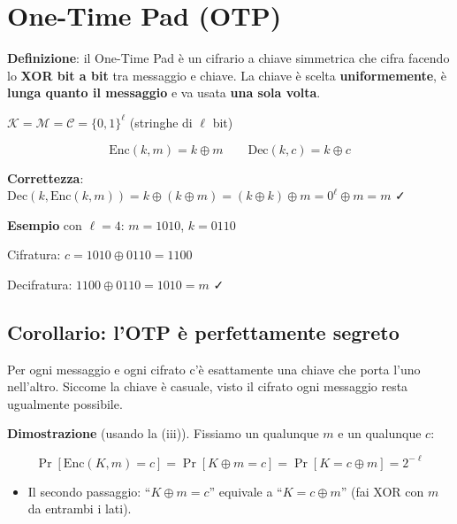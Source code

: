 \section{One-Time Pad (OTP)}

\textbf{Definizione}: il One-Time Pad è un cifrario a chiave simmetrica che cifra facendo lo \textbf{XOR bit a bit} tra messaggio e chiave. La chiave è scelta \textbf{uniformemente}, è \textbf{lunga quanto il messaggio} e va usata \textbf{una sola volta}.

\(\mathcal{K} = \mathcal{M} = \mathcal{C} = \{0,1\}^\ell\) (stringhe di \(\ell\) bit)

\[
\text{Enc}(k, m) = k \oplus m \qquad \text{Dec}(k, c) = k \oplus c
\]

\textbf{Correttezza}: \(\text{Dec}(k, \text{Enc}(k, m)) = k \oplus (k \oplus m) = (k \oplus k) \oplus m = 0^\ell \oplus m = m\) ✓

\begin{esempio}

\textbf{Esempio} con \(\ell = 4\): \(m = 1010\), \(k = 0110\)

Cifratura: \(c = 1010 \oplus 0110 = 1100\)

Decifratura: \(1100 \oplus 0110 = 1010 = m\) ✓

\end{esempio}

\subsection{Corollario: l'OTP è perfettamente segreto}

\begin{inbreve}

Per ogni messaggio e ogni cifrato c'è esattamente una chiave che porta l'uno nell'altro. Siccome la chiave è casuale, visto il cifrato ogni messaggio resta ugualmente possibile.

\end{inbreve}

\textbf{Dimostrazione} (usando la (iii)). Fissiamo un qualunque \(m\) e un qualunque \(c\):

\[
\Pr[\text{Enc}(K, m) = c] = \Pr[K \oplus m = c] = \Pr[K = c \oplus m] = 2^{-\ell}
\]

\begin{itemize}
\tightlist
\item
  Il secondo passaggio: ``\(K \oplus m = c\)'' equivale a ``\(K = c \oplus m\)'' (fai XOR con \(m\) da entrambi i lati).
\end{itemize}

